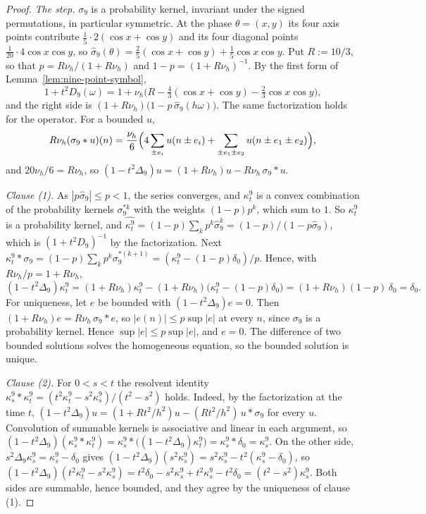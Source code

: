 \begin{proof}
\emph{The step.} $\sigma_9$ is a probability kernel, invariant under the signed permutations, in
particular symmetric. At the phase $\theta = (x, y)$ its four axis points contribute
$\tfrac15\cdot2(\cos x + \cos y)$ and its four diagonal points $\tfrac1{20}\cdot4\cos x\cos y$, so
$\widehat\sigma_9(\theta) = \tfrac25(\cos x + \cos y) + \tfrac15\cos x\cos y$. Put $R := 10/3$, so that
$p = R\nu_h/(1 + R\nu_h)$ and $1 - p = (1 + R\nu_h)^{-1}$. By the first form of
Lemma~\ref{lem:nine-point-symbol},
\[
  1 + t^2D_9(\omega) = 1 + \nu_h\bigl(R - \tfrac43(\cos x + \cos y) - \tfrac23\cos x\cos y\bigr) ,
\]
and the right side is $(1 + R\nu_h)\bigl(1 - p\,\widehat\sigma_9(h\omega)\bigr)$. The same
factorization holds for the operator. For a bounded $u$,
\[
  R\nu_h(\sigma_9 * u)(n) = \frac{\nu_h}{6}\Bigl(4\sum_{\pm e_i}u(n \pm e_i)
  + \sum_{\pm e_1 \pm e_2}u(n \pm e_1 \pm e_2)\Bigr) ,
\]
and $20\nu_h/6 = R\nu_h$, so $(1 - t^2\Delta_9)u = (1 + R\nu_h)u - R\nu_h\,\sigma_9 * u$.

\emph{Clause (1).} As $|p\widehat\sigma_9| \le p < 1$, the series converges, and $\kappa^9_t$ is a convex
combination of the probability kernels $\sigma_9^{*k}$ with the weights $(1-p)p^k$, which sum to $1$.
So $\kappa^9_t$ is a probability kernel, and
$\widehat{\kappa^9_t} = (1-p)\sum_kp^k\widehat\sigma_9^k = (1-p)/(1 - p\widehat\sigma_9)$, which is
$(1 + t^2D_9)^{-1}$ by the factorization. Next
$\kappa^9_t * \sigma_9 = (1-p)\sum_kp^k\sigma_9^{*(k+1)} = (\kappa^9_t - (1-p)\delta_0)/p$. Hence, with
$R\nu_h/p = 1 + R\nu_h$,
\[
  (1 - t^2\Delta_9)\kappa^9_t = (1 + R\nu_h)\kappa^9_t - (1 + R\nu_h)\bigl(\kappa^9_t - (1-p)\delta_0\bigr)
  = (1 + R\nu_h)(1-p)\,\delta_0 = \delta_0 .
\]
For uniqueness, let $e$ be bounded with $(1 - t^2\Delta_9)e = 0$. Then
$(1 + R\nu_h)e = R\nu_h\,\sigma_9 * e$, so $|e(n)| \le p\sup|e|$ at every $n$, since $\sigma_9$ is a
probability kernel. Hence $\sup|e| \le p\sup|e|$, and $e = 0$. The difference of two bounded
solutions solves the homogeneous equation, so the bounded solution is unique.

\emph{Clause (2).} For $0 < s < t$ the resolvent identity
$\kappa^9_s * \kappa^9_t = (t^2\kappa^9_t - s^2\kappa^9_s)/(t^2 - s^2)$ holds. Indeed, by the
factorization at the time $t$, $(1 - t^2\Delta_9)u = (1 + Rt^2/h^2)u - (Rt^2/h^2)\,u * \sigma_9$ for
every $u$. Convolution of summable kernels is associative and linear in each argument, so
$(1 - t^2\Delta_9)(\kappa^9_s * \kappa^9_t) = \kappa^9_s * \bigl((1 - t^2\Delta_9)\kappa^9_t\bigr) =
\kappa^9_s * \delta_0 = \kappa^9_s$. On the other
side, $s^2\Delta_9\kappa^9_s = \kappa^9_s - \delta_0$ gives
$(1 - t^2\Delta_9)(s^2\kappa^9_s) = s^2\kappa^9_s - t^2(\kappa^9_s - \delta_0)$, so
$(1 - t^2\Delta_9)(t^2\kappa^9_t - s^2\kappa^9_s) = t^2\delta_0 - s^2\kappa^9_s + t^2\kappa^9_s - t^2\delta_0 =
(t^2 - s^2)\kappa^9_s$. Both sides are summable, hence bounded, and they agree by the uniqueness of
clause (1).


\end{proof}
